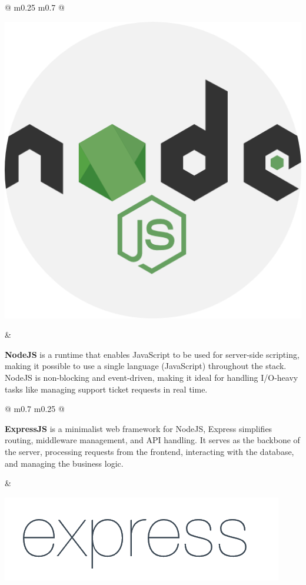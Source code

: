 	\vspace*{0.5 cm}
	\begin{tabular}{ @{} m{0.25\textwidth} m{0.7\textwidth} @{} }
		\begin{minipage}{\linewidth}
			\centering
			\includegraphics[width=0.5\linewidth]{graphics/nodejs.png}
			\label{fig:nodejs}
		\end{minipage}
		&
		\begin{minipage}{\linewidth}
			\textbf{NodeJS} is a runtime that enables JavaScript to be used for server-side scripting, making it possible to use a single language (JavaScript) throughout the stack. NodeJS is non-blocking and event-driven, making it ideal for handling I/O-heavy tasks like managing support ticket requests in real time.
		\end{minipage}
	\end{tabular}
	
	\vspace*{0.5cm}
	
	\begin{tabular}{ @{} m{0.7\textwidth} m{0.25\textwidth} @{} }
		\begin{minipage}{\linewidth}
			\textbf{ExpressJS} is a minimalist web framework for NodeJS, Express simplifies routing, middleware management, and API handling. It serves as the backbone of the server, processing requests from the frontend, interacting with the database, and managing the business logic.
		\end{minipage}
		&
		\begin{minipage}{\linewidth}
			\centering
			\includegraphics[width=0.8\linewidth]{graphics/expressjs.png}
			\label{fig:expressjs}
			
		\end{minipage}
	\end{tabular}
	
